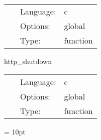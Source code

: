 \hspace{5mm}

 \begin{tabular*}{160mm}{cll} 
~ & Language:  & c \\ 
~ & Options:  & global \\ 
~ & Type:  & function \\ 
\end{tabular*} 


\vspace{5mm}


\hspace{5mm} http\_shutdown 

\hspace{5mm}{\it http daemon shutdown } 


\hspace{5mm}

 \begin{tabular*}{160mm}{cll} 
~ & Language:  & c \\ 
~ & Options:  & global \\ 
~ & Type:  & function \\ 
\end{tabular*} 



\vspace{5mm}\parskip = 10pt 


